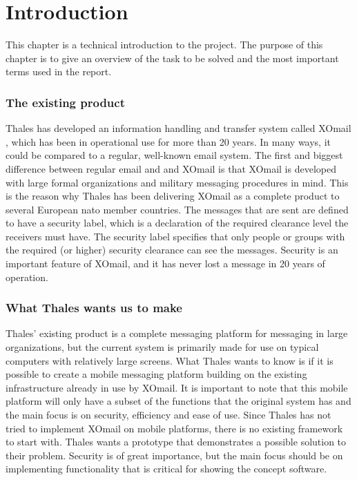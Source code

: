 \chapter{Introduction}

This chapter is a technical introduction to the project. The purpose of this chapter is to give an overview of the task to be solved and the most important terms used in the report.

\subsection*{The existing product}
Thales has developed an information handling and transfer system called XOmail \cite{bib:xomail}, which has been in operational use for more than 20 years. In many ways, it could be compared to a regular, well-known email system. The first and biggest difference between regular email and and XOmail is that XOmail is developed with large formal organizations and military messaging procedures in mind. This is the reason why Thales has been delivering XOmail as a complete product to several European \gls{nato} member countries.  
\newline
\newline
The messages that are sent are defined to have a security label, which is a declaration of the required clearance level the receivers must have. The security label specifies that only people or groups with the required (or higher) security clearance can see the messages. Security is an important feature of XOmail, and it has never lost a message in 20 years of operation. 

\subsection*{What Thales wants us to make}
Thales’ existing product is a complete messaging platform for messaging in large organizations, but the current system is primarily made for use on typical computers with relatively large screens. What Thales wants to know is if it is possible to create a mobile messaging platform building on the existing infrastructure already in use by XOmail. It is important to note that this mobile platform will only have a subset of the functions that the original system has and the main focus is on security, efficiency and ease of use.
\newline
\newline
Since Thales has not tried to implement XOmail on mobile platforms, there is no existing framework to start with. Thales wants a prototype that demonstrates a possible solution to their problem. Security is of great importance, but the main focus should be on implementing functionality that is critical for showing the concept software.  

